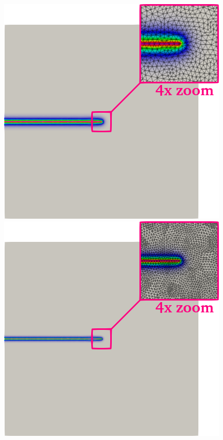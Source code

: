 \begin{figure}[tb]
\begin{minipage}[t]{.3\textwidth}
		\centering \includegraphics[width=.92\textwidth]{./Images/d-level2.png}
	\end{minipage}
	\begin{minipage}[t]{.3\textwidth}
		\centering \includegraphics[width=.92\textwidth]{./Images/d-level3.png}

\end{minipage}
\end{figure}
